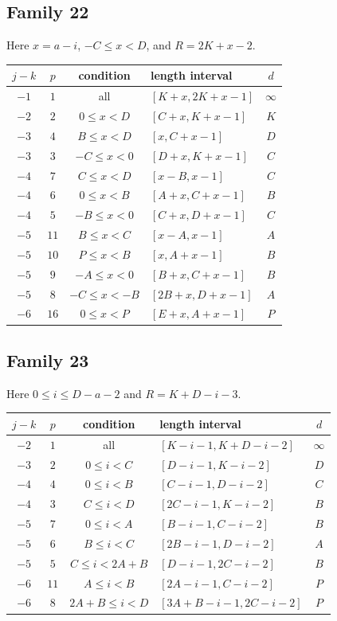 \documentclass[11pt]{amsart}
\begin{document}
\subsection*{Family 22}
Here $x=a-i$, $-C\le x<D$, and $R=2K+x-2$.
\begin{center}\small
\begin{tabular}{ccclc}
\toprule
$j-k$&$p$&condition&length interval&$d$\\\midrule
$-1$&$1$&all&$[K+x,2K+x-1]$&$\infty$\\
$-2$&$2$&$0\le x<D$&$[C+x,K+x-1]$&$K$\\
$-3$&$4$&$B\le x<D$&$[x,C+x-1]$&$D$\\
$-3$&$3$&$-C\le x<0$&$[D+x,K+x-1]$&$C$\\
$-4$&$7$&$C\le x<D$&$[x-B,x-1]$&$C$\\
$-4$&$6$&$0\le x<B$&$[A+x,C+x-1]$&$B$\\
$-4$&$5$&$-B\le x<0$&$[C+x,D+x-1]$&$C$\\
$-5$&$11$&$B\le x<C$&$[x-A,x-1]$&$A$\\
$-5$&$10$&$P\le x<B$&$[x,A+x-1]$&$B$\\
$-5$&$9$&$-A\le x<0$&$[B+x,C+x-1]$&$B$\\
$-5$&$8$&$-C\le x<-B$&$[2B+x,D+x-1]$&$A$\\
$-6$&$16$&$0\le x<P$&$[E+x,A+x-1]$&$P$\\
\bottomrule
\end{tabular}\end{center}

\subsection*{Family 23}
Here $0\le i\le D-a-2$ and $R=K+D-i-3$.
\begin{center}\small
\begin{tabular}{ccclc}
\toprule
$j-k$&$p$&condition&length interval&$d$\\\midrule
$-2$&$1$&all&$[K-i-1,K+D-i-2]$&$\infty$\\
$-3$&$2$&$0\le i<C$&$[D-i-1,K-i-2]$&$D$\\
$-4$&$4$&$0\le i<B$&$[C-i-1,D-i-2]$&$C$\\
$-4$&$3$&$C\le i<D$&$[2C-i-1,K-i-2]$&$B$\\
$-5$&$7$&$0\le i<A$&$[B-i-1,C-i-2]$&$B$\\
$-5$&$6$&$B\le i<C$&$[2B-i-1,D-i-2]$&$A$\\
$-5$&$5$&$C\le i<2A+B$&$[D-i-1,2C-i-2]$&$B$\\
$-6$&$11$&$A\le i<B$&$[2A-i-1,C-i-2]$&$P$\\
$-6$&$8$&$2A+B\le i<D$&$[3A+B-i-1,2C-i-2]$&$P$\\
\bottomrule
\end{tabular}\end{center}
\end{document}
